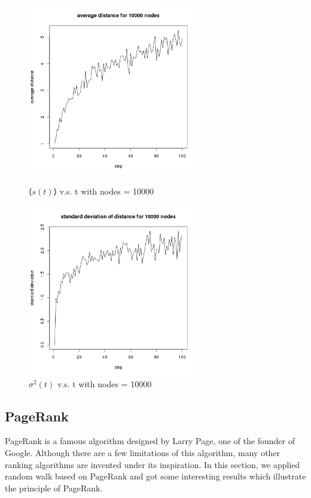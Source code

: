 \documentclass[draftcls,12pt,onecolumn]{IEEEtran}
\begin{document}
\begin{figure}[htbp]
\centering
\begin{minipage}[t]{0.48\textwidth}
\centering
\includegraphics[width=7.5cm]{2_2_d_10000_distance.png}
\caption{⟨$s(t)$⟩ v.s. t with nodes = 10000}
\label{fig16}
\end{minipage}
\begin{minipage}[t]{0.48\textwidth}
\centering
\includegraphics[width=7.5cm]{2_2_d_10000_deviation.png}
\caption{$\sigma^2(t)$ v.s. t with nodes = 10000}
\label{fig17}
\end{minipage}
\end{figure}







\subsection{PageRank}
PageRank is a famous algorithm designed by Larry Page, one of the founder of Google. Although there are a few limitations of this algorithm, many other ranking algorithms are invented under its inspiration. In this section, we applied random walk based on PageRank and got some interesting results which illustrate the principle of PageRank.
\end{document}

